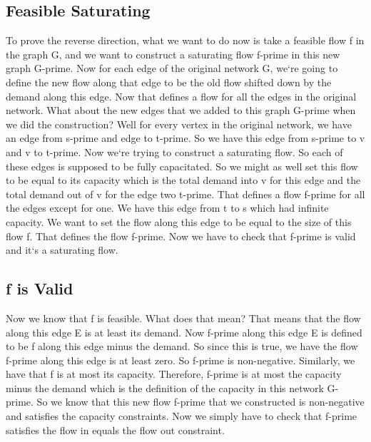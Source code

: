 \subsection{Feasible Saturating}
To prove the reverse direction, what we want to do now is take a feasible flow f in the graph G, and we want to construct a saturating flow f-prime in this new graph G-prime.
Now for each edge of the original network G, we`re going to define the new flow along that edge to be the old flow shifted down by the demand along this edge.
Now that defines a flow for all the edges in the original network.
What about the new edges that we added to this graph G-prime when we did the construction? Well for every vertex in the original network, we have an edge from s-prime and edge to t-prime.
So we have this edge from s-prime to v and v to t-prime.
Now we`re trying to construct a saturating flow.
So each of these edges is supposed to be fully capacitated.
So we might as well set this flow to be equal to its capacity which is the total demand into v for this edge and the total demand out of v for the edge two t-prime.
That defines a flow f-prime for all the edges except for one.
We have this edge from t to s which had infinite capacity.
We want to set the flow along this edge to be equal to the size of this flow f.
That defines the flow f-prime.
Now we have to check that f-prime is valid and it`s a saturating flow.

\subsection{f is Valid}
Now we know that f is feasible.
What does that mean? That means that the flow along this edge E is at least its demand.
Now f-prime along this edge E is defined to be f along this edge minus the demand.
So since this is true, we have the flow f-prime along this edge is at least zero.
So f-prime is non-negative.
Similarly, we have that f is at most its capacity.
Therefore, f-prime is at most the capacity minus the demand which is the definition of the capacity in this network G-prime.
So we know that this new flow f-prime that we constructed is non-negative and satisfies the capacity constraints.
Now we simply have to check that f-prime satisfies the flow in equals the flow out constraint.


